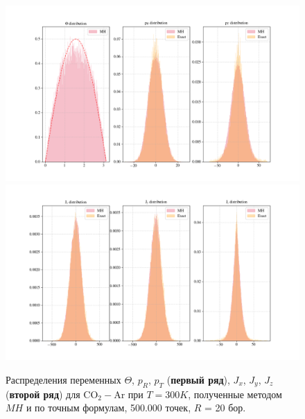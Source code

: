 \begin{figure}[ht!]
	\includegraphics[width=\textwidth]{../pictures/co2arDistributions1.png}
	\includegraphics[width=\textwidth]{../pictures/co2arDistributions2.png}
	\caption{Распределения переменных $\Theta$, $p_R$, $p_T$ (\textbf{первый ряд}), $J_x$, $J_y$, $J_z$ (\textbf{второй ряд}) для CO$_2-$Ar при $T = 300 K$, полученные методом $MH$ и по точным формулам, 500.000 точек, $R$ = 20 бор.}
	\label{fig:co2ar_comparison}
\end{figure}


